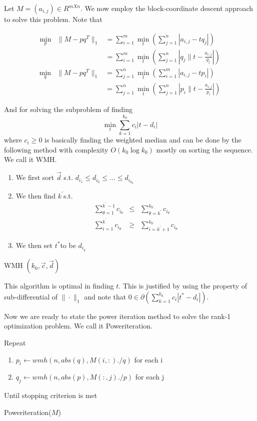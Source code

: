 Let $M=(a_{i,j})\in R^{mXn}$. We now employ the block-coordinate
descent approach to solve this problem. Note that

\begin{eqnarray}
\min_{p} & \|M-pq^{T}\|_{1} & =\sum_{i=1}^{m}\min_{t}(\sum_{j=1}^{n}|a_{i,j}-tq_{j}|)\\
 &  & =\sum_{i=1}^{m}\min_{t}(\sum_{j=1}^{n}|q_{j}\|t-\frac{a_{i,j}}{q_{j}}|)\nonumber
\end{eqnarray}
\begin{eqnarray}
\min_{q} & \|M-pq^{T}\|_{1} & =\sum_{j=1}^{n}\min_{t}(\sum_{i=1}^{m}|a_{i,j}-tp_{i}|)\\
 &  & =\sum_{j=1}^{n}\min_{t}(\sum_{j=1}^{n}|p_{i}\|t-\frac{a_{i,j}}{p_{i}}|)\nonumber
\end{eqnarray}


And for solving the subproblem of finding
\[
\min_{t}\sum_{k=1}^{k_{0}}c_{i}|t-d_{i}|
\]
where $c_{i}\ge0$ is basically finding the weighted median and can
be done by the following method with complexity $O(k_{0}\log k_{0})$
mostly on sorting the sequence. We call it WMH.

\begin{algorithm}[h]
\begin{enumerate}
\item We first sort $\vec{\ensuremath{d}}$ s.t. $d_{i_{1}}\le d_{i_{2}}\le...\le d_{i_{k_{0}}}$
\item We then find $k^{'}$s.t.
\begin{eqnarray*}
\sum_{\theta=1}^{k^{'}-1}c_{i_{\theta}} & \le & \sum_{\theta=k^{'}}^{k_{0}}c_{i_{\theta}}\\
\sum_{i=1}^{k^{'}}c_{i_{\theta}} & \ge & \sum_{i=k^{'}+1}^{k_{0}}c_{i_{\theta}}
\end{eqnarray*}

\item We then set $t^{*}$to be $d_{i_{k^{'}}}$
\end{enumerate}
\caption{WMH $(k_{0},\vec{c},\vec{d})$}
\end{algorithm}


This algorithm is optimal in finding $t$. This is justified by using
the property of sub-differential of $\|\cdot\|_{1}$ and note that
$0\in\partial(\sum_{k=1}^{k_{0}}c_{i}|t^{*}-d_{i}|)$.

Now we are ready to state the power iteration method to solve the
rank-1 optimization problem. We call it Poweriteration.

\begin{algorithm}[h]
Repeat
\begin{enumerate}
\item $p_{i}\leftarrow wmh(n,abs(q),M(i,:)./q)$ for each i
\item $q_{j}\leftarrow wmh(n,abs(p),M(:,j)./p)$ for each j
\end{enumerate}
Until stopping criterion is met

\caption{Poweriteration($M$)}
\end{algorithm}



